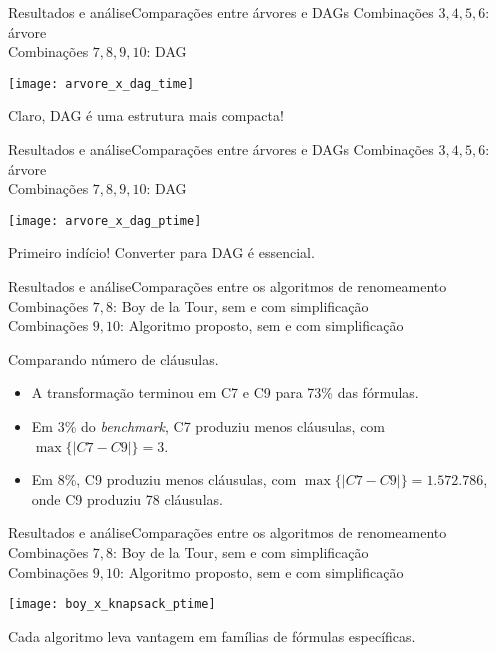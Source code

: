 \begin{frame}{Resultados e análise}{Comparações entre árvores e DAGs}
	Combinações $3,4,5,6$: árvore\\
	Combinações $7,8,9,10$: DAG
	
	\vspace{-.4cm}
	\pause
	\begin{center}
		\texttt{[image: arvore\_x\_dag\_time]}
	\end{center}
	
	\vspace{-.6cm}
	\pause Claro, DAG é uma estrutura mais compacta!
\end{frame}

\begin{frame}{Resultados e análise}{Comparações entre árvores e DAGs}
	Combinações $3,4,5,6$: árvore\\
	Combinações $7,8,9,10$: DAG
	
	\vspace{-.4cm}
	\pause
	\begin{center}
		\texttt{[image: arvore\_x\_dag\_ptime]}
	\end{center}
	
	\vspace{-.6cm}
	\pause Primeiro indício! \pause Converter para DAG é essencial.
\end{frame}

\begin{frame}{Resultados e análise}{Comparações entre os algoritmos de renomeamento}
	Combinações $7,8$: Boy de la Tour, sem e com simplificação\\
	Combinações $9,10$: Algoritmo proposto, sem e com simplificação
	
	\pause \begin{center}Comparando número de cláusulas.\end{center}
	\begin{itemize}
		\pause\item A transformação terminou em C7 e C9 para 73\% das fórmulas.
		\pause\item Em 3\% do \textit{benchmark}, C7 produziu menos cláusulas, com $\max \{|C7-C9| \} = 3$.
		\pause\item Em 8\%, C9 produziu menos cláusulas, com $\max \{|C7-C9| \} = 1.572.786$, onde C9 produziu 78 cláusulas.
	\end{itemize}
\end{frame}

\begin{frame}{Resultados e análise}{Comparações entre os algoritmos de renomeamento}
	Combinações $7,8$: Boy de la Tour, sem e com simplificação\\
	Combinações $9,10$: Algoritmo proposto, sem e com simplificação
	
	\vspace{-.4cm}
	\pause
	\begin{center}
		\texttt{[image: boy\_x\_knapsack\_ptime]}
	\end{center}
	
	\vspace{-.6cm}
	\pause Cada algoritmo leva vantagem em famílias de fórmulas específicas.
\end{frame}

